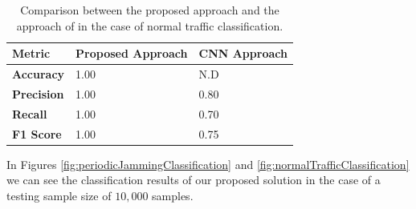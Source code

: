 \documentclass[futureinternet,article,submit,pdftex,moreauthors]{Definitions/mdpi}
\begin{document}
\begin{table}[H]
	\caption{Comparison between the proposed approach and the approach of \cite{JammingDetectionIoT-Hussain} in the case of normal traffic classification.}\label{tab:normal_traffic_comparison}
	\begin{tabularx}{\textwidth}{CCC}
	\toprule
	\textbf{Metric} & \textbf{Proposed Approach} & \textbf{CNN Approach} \\
	\midrule
	\textbf{Accuracy}  & 1.00 & N.D \\
	\textbf{Precision} & 1.00 & 0.80 \\
	\textbf{Recall}    & 1.00 & 0.70 \\
	\textbf{F1 Score}  & 1.00 & 0.75 \\
	\bottomrule
	\end{tabularx}
\end{table}

In Figures \ref{fig:periodicJammingClassification} and \ref{fig:normalTrafficClassification} we can see the classification results of our proposed solution in the case of a testing sample size of $10,000$ samples.
\end{document}
